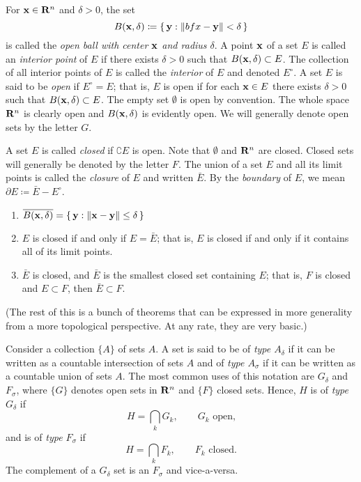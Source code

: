 For $\mathbf{x}\in\mathbf{R}^n$ and $\delta>0$, the set
\begin{equation}
\label{eq:open-ball-r-n}
B(\mathbf{x},\delta)\coloneqq\left\{\,\mathbf{y}:\|bfx-\mathbf{y}\|<\delta\,\right\}
\end{equation}
is called the \emph{open ball with center $\mathbf{x}$ and radius $\delta$}. A
point $\mathbf{x}$ of a set $E$ is called an \emph{interior point} of $E$ if
there exists $\delta>0$ such that $B(\mathbf{x},\delta)\subset E$. The collection
of all interior points of $E$ is called the \emph{interior} of $E$ and
denoted $E^\circ$. A set $E$ is said to be \emph{open} if $E^\circ=E$; that
is, $E$ is open if for each $\mathbf{x}\in E$ there exists $\delta>0$ such that
$B(\mathbf{x},\delta)\subset E$. The empty set $\emptyset$ is open by
convention. The whole space $\mathbf{R}^n$ is clearly open and $B(\mathbf{x},\delta)$
is evidently open. We will generally denote open sets by the letter $G$.

A set $E$ is called \emph{closed} if $\complement E$ is open. Note that
$\emptyset$ and $\mathbf{R}^n$ are closed. Closed sets will generally be denoted
by the letter $F$. The union of a set $E$ and all its limit points is
called the \emph{closure} of $E$ and written $\bar E$. By the
\emph{boundary} of $E$, we mean $\partial E\coloneqq \bar E\minus
E^\circ$.
\begin{theorem}[1.5]
\begin{enumerate}[label=\textnormal{(\roman*)}]
\item $\overline{B(\mathbf{x},\delta)}=\left\{\,\mathbf{y}:\|\mathbf{x}-\mathbf{y}\|\leq\delta\, \right\}$
\item $E$ is closed if and only if $E=\bar E$; that is, $E$ is closed if
  and only if it contains all of its limit points.
\item $\bar E$ is closed, and $\bar E$ is the smallest closed set
  containing $E$; that is, $F$ is closed and $E\subset F$, then $\bar
  E\subset F$.
\end{enumerate}
\end{theorem}

(The rest of this is a bunch of theorems that can be expressed in more
generality from a more topological perspective. At any rate, they are very
basic.)

Consider a collection $\{A\}$ of sets $A$. A set is said to be of \emph{type
$A_\delta$} if it can be written as a countable intersection of sets $A$
and of \emph{type $A_\sigma$} if it can be written as a countable union of
sets $A$. The most common uses of this notation are $G_\delta$ and
$F_\sigma$, where $\{G\}$ denotes open sets in $\mathbf{R}^n$ and $\{F\}$ closed
sets. Hence, $H$ is of \emph{type $G_\delta$} if
\begin{equation}
  \label{eq:G-delta}
H=\bigcap_k G_k,\qquad \text{$G_k$ open,}
\end{equation}
and is of \emph{type $F_\sigma$} if
\begin{equation}
  \label{eq:F-sigma}
H=\bigcap_k F_k,\qquad\text{$F_k$ closed.}
\end{equation}
The complement of a $G_\delta$ set is an $F_\sigma$ and vice-a-versa.

